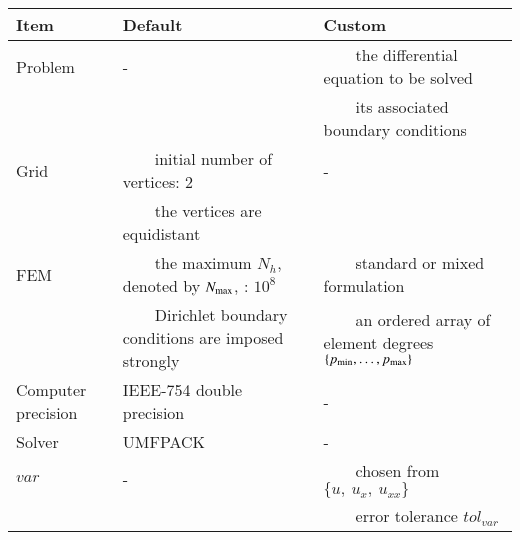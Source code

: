 \documentclass[review,3p]{elsarticle}
\newcommand{\tabitem}{~~\llap{\textbullet}~~}           %
\begin{document}
\begin{table}[!ht]
\label{settings_algorithm}
  \centering
  \begin{tabular}{lL{5cm}L{6cm}}
    \toprule
    Item & Default & Custom  \\
    \midrule
    Problem & - & \tabitem the differential equation to be solved \\
     &  & \tabitem its associated boundary conditions \\\hline
    Grid & \tabitem initial number of vertices: 2 & - \\
     & \tabitem the vertices are equidistant &  \\\hline
    FEM & \tabitem the maximum $N_h$, denoted by $N_{\rm max}$, : $10^8$ & \tabitem standard or mixed formulation \\
    & \tabitem Dirichlet boundary conditions are imposed strongly & \tabitem an ordered array of element degrees $\{p_{\min}, \ldots, p_{\rm max}\}$ \\\hline
    Computer precision & IEEE-754 double precision & - \\\hline
    Solver & UMFPACK & - \\\hline
    $var$ & - & \tabitem chosen from $\{u,~u_x,~u_{xx}\}$ \\     
    & & \tabitem error tolerance $tol_{var}$ \\     
    \bottomrule
  \end{tabular}
\end{table}
\end{document}
